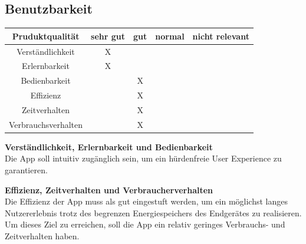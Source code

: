 \documentclass[parskip=full]{scrartcl}
\begin{document}
\subsection{Benutzbarkeit}
\begin{tabular}{| c | c | c | c | c |}
    \hline
    \textbf{Pruduktqualität} & \textbf{sehr gut} & \textbf{gut} & \textbf{normal} & \textbf{nicht relevant} \\ \hline
    Verständlichkeit         & X                 &              &                 &                         \\ \hline
    Erlernbarkeit            & X                 &              &                 &                         \\ \hline
    Bedienbarkeit            &                   & X            &                 &                         \\ \hline
    Effizienz                &                   & X            &                 &                         \\ \hline
    Zeitverhalten            &                   & X            &                 &                         \\ \hline
    Verbrauchsverhalten      &                   & X            &                 &                         \\ \hline
\end{tabular}

\textbf{Verständlichkeit, Erlernbarkeit und Bedienbarkeit}\\
Die App soll intuitiv zugänglich sein, um ein hürdenfreie User Experience zu garantieren.

\textbf{Effizienz, Zeitverhalten und Verbraucherverhalten}\\
Die Effizienz der App muss als gut eingestuft werden, um ein möglichst langes Nutzererlebnis trotz des begrenzen Energiespeichers des Endgerätes zu realisieren.
Um dieses Ziel zu erreichen, soll die App ein relativ geringes Verbrauchs- und Zeitverhalten haben.
\end{document}
